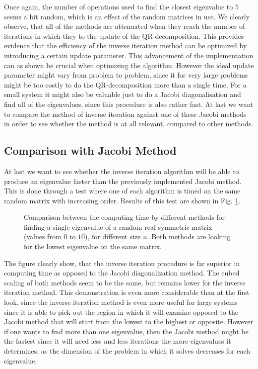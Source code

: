 \documentclass[twocolumn]{article}
\begin{document}
Once again, the number of operations used to find the closest eigenvalue to $5$ seems a bit random, which is an effect of the random matrices in use.
We clearly observe, that all of the methods are attenuated when they reach the number of iterations in which they to the update of the QR-decomposition. This provides evidence that the efficiency of the inverse iteration method can be optimized by introducing a certain update parameter. This advancement of the implementation can as shown be crucial when optimizing the algorithm. However the ideal update parameter might vary from problem to problem, since it for very large problems might be too costly to do the QR-decomposition more than a single time. For a small system it might also be valuable just to do a Jacobi diagonalisation and find all of the eigenvalues, since this procedure is also rather fast. At last we want to compare the method of inverse iteration against one of these Jacobi methods in order to see whether the method is at all relevant, compared to other methods.

\subsection{\label{sec:8}Comparison with Jacobi Method}

At last we want to see whether the inverse iteration algorithm will be able to produce an eigenvalue faster than the previously implemented Jacobi method. This is done through a test where one of each algorithm is timed on the same random matrix with increasing order. Results of this test are shown in Fig. \ref{fig3}.

\begin{figure}[h]

\caption{Comparison between the computing time by different methods for finding a single eigenvalue of a random real symmetric matrix (values from $0$ to $10$), for different size $n$. Both methods are looking for the lowest eigenvalue on the same matrix.}
\label{fig3}
\end{figure}

The figure clearly show, that the inverse iteration procedure is far superior in computing time as opposed to the Jacobi diagonalization method. The cubed scaling of both methods seem to be the same, but remains lower for the inverse iteration method. This demonstration is even more considerable than at the first look, since the inverse iteration method is even more useful for large systems since it is able to pick out the region in which it will examine opposed to the Jacobi method that will start from the lowest to the highest or opposite. However if one wants to find more than one eigenvalue, then the Jacobi method might be the fastest since it will need less and less iterations the more eigenvalues it determines, as the dimension of the problem in which it solves decreases for each eigenvalue.
\end{document}
